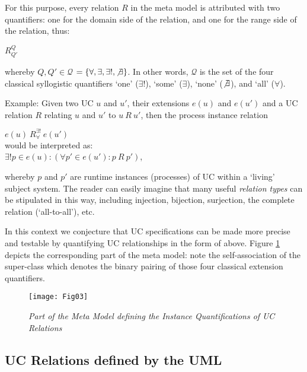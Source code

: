 For this purpose, every relation $R$ in the meta model is 
attributed with two quantifiers: one for the domain side 
of the relation, and one for the range side of the relation, 
thus:
\begin{center} 
$R^{Q}_{Q'}$ 
\end{center}
whereby $Q, Q' \in \mathcal{Q}$ $= \{\forall, \exists, 
\exists!, \not\exists\}$. In other words, $\mathcal{Q}$ 
is the set of the four classical syllogistic quantifiers
`one' ($\exists!$), `some' ($\exists$), `none' ($\not\exists$), 
and `all' ($\forall$).

Example: Given two UC $u$ and $u'$, their extensions 
$e(u)$ and $e(u')$ and a UC relation $R$ relating $u$ 
and $u'$ to $u~R~u'$, then the process instance relation
\begin{center} 
$e(u)~R^{\exists!}_{\forall}~e(u')$\\
would be interpreted as:\\
$\exists! p\in e(u): (\forall p'\in e(u'): p~R~p')$,
\end{center}
whereby $p$ and $p'$ are runtime instances (processes) of UC within 
a `living' subject system. The reader can easily imagine that many 
useful \emph{relation types} can be stipulated in this way, including 
injection, bijection, surjection, the complete relation (`all-to-all'), 
etc.

In this context we conjecture that UC specifications can be made 
more precise and testable by quantifying UC relationships in the 
form of above. Figure \ref{fig:3} depicts the corresponding part 
of the meta model: note the self-association of the super-class 
which denotes the binary pairing of those four classical extension
quantifiers.
\begin{figure}[t!]
\begin{center}
\texttt{[image: Fig03]}\\   
\caption{\it Part of the Meta Model defining the
         Instance Quantifications of UC Relations}
\label{fig:3} 
\end{center} 
\end{figure}

\subsection{UC Relations defined by the UML}


